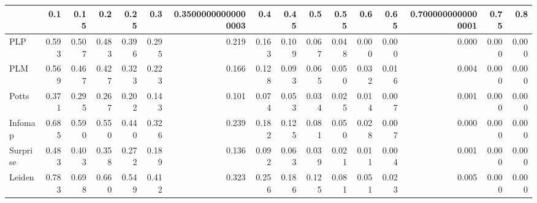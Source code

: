 \begin{tabular}{lrrrrrrrrrrrrrrr}
\toprule
{} &   0.1 &  0.15 &   0.2 &  0.25 &   0.3 & 0.35000000000000003 &   0.4 &  0.45 &   0.5 &  0.55 &   0.6 &  0.65 & 0.7000000000000001 &  0.75 &   0.8 \\
\midrule
PLP      & 0.593 & 0.507 & 0.483 & 0.396 & 0.295 &               0.219 & 0.163 & 0.109 & 0.067 & 0.048 & 0.000 & 0.000 &              0.000 & 0.000 & 0.000 \\
PLM      & 0.569 & 0.467 & 0.427 & 0.323 & 0.223 &               0.166 & 0.128 & 0.093 & 0.065 & 0.050 & 0.032 & 0.016 &              0.004 & 0.000 & 0.000 \\
Potts    & 0.371 & 0.295 & 0.267 & 0.202 & 0.143 &               0.101 & 0.074 & 0.053 & 0.034 & 0.025 & 0.014 & 0.007 &              0.001 & 0.000 & 0.000 \\
Infomap  & 0.685 & 0.590 & 0.550 & 0.440 & 0.326 &               0.239 & 0.182 & 0.125 & 0.081 & 0.050 & 0.028 & 0.007 &              0.000 & 0.000 & 0.000 \\
Surprise & 0.483 & 0.403 & 0.358 & 0.272 & 0.189 &               0.136 & 0.092 & 0.063 & 0.039 & 0.021 & 0.011 & 0.004 &              0.001 & 0.000 & 0.000 \\
Leiden   & 0.783 & 0.698 & 0.660 & 0.549 & 0.412 &               0.323 & 0.256 & 0.186 & 0.125 & 0.081 & 0.051 & 0.023 &              0.005 & 0.000 & 0.000 \\
\bottomrule
\end{tabular}
